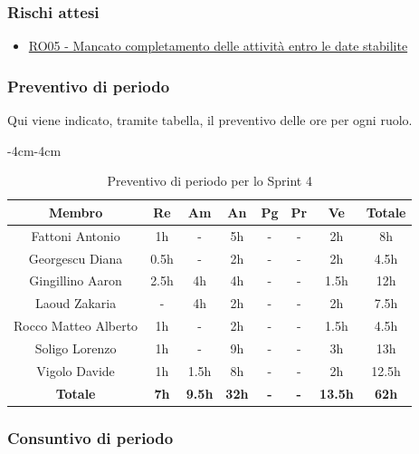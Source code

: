 \documentclass[a4paper,12pt]{article}
\begin{document}
\subsubsection{Rischi attesi}
\begin{itemize}
    \item \hyperref[RO05]{RO05 - Mancato completamento delle attività entro le date stabilite}
\end{itemize}

\subsubsection{Preventivo di periodo}
Qui viene indicato, tramite tabella, il preventivo delle ore per ogni ruolo.
\begin{table}[H]
    \begin{adjustwidth}{-4cm}{-4cm}
    \centering
    \begin{tabular}{|c|c|c|c|c|c|c|c|}
        \hline
        \textbf{Membro}& \textbf{Re} & \textbf{Am} & \textbf{An} & \textbf{Pg} & \textbf{Pr} & \textbf{Ve} & \textbf{Totale} \\
        \hline
        Fattoni Antonio & 1h & - & 5h & - & - & 2h & 8h \\
        \hline
        Georgescu Diana & 0.5h & - & 2h & - & - & 2h & 4.5h \\
        \hline
        Gingillino Aaron& 2.5h & 4h & 4h & - & - & 1.5h & 12h \\
        \hline
        Laoud Zakaria& - & 4h & 2h & - & - & 2h & 7.5h \\
        \hline
        Rocco Matteo Alberto & 1h & - & 2h & - & - & 1.5h & 4.5h \\
        \hline
        Soligo Lorenzo& 1h & - & 9h & - & - & 3h & 13h \\
        \hline
        Vigolo Davide & 1h & 1.5h & 8h & - & - & 2h & 12.5h \\
        \hline
        \textbf{Totale} & \textbf{7h} & \textbf{9.5h} & \textbf{32h} & \textbf{-} & \textbf{-} & \textbf{13.5h} & \textbf{62h} \\
        \hline
    \end{tabular}
    \caption{Preventivo di periodo per lo Sprint 4}
    \end{adjustwidth}
\end{table}

\subsubsection{Consuntivo di periodo}
\end{document}
